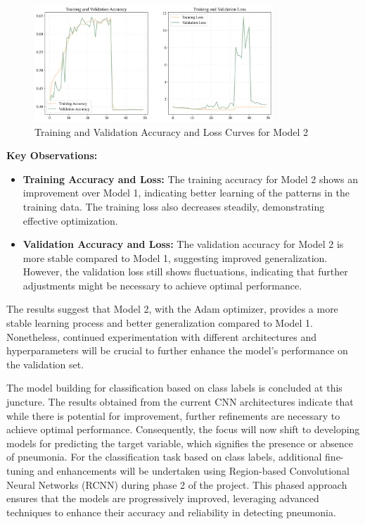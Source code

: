 \begin{figure}[H]
    \centering
    \includegraphics[width=0.8\textwidth]{figures/Figure30.png}
    \caption{Training and Validation Accuracy and Loss Curves for Model 2}
    \label{fig:chap3 figure2}
\end{figure}


\textbf{Key Observations:}
\begin{itemize}
    \item \textbf{Training Accuracy and Loss:} The training accuracy for Model 2 shows an improvement over Model 1, indicating better learning of the patterns in the training data. The training loss also decreases steadily, demonstrating effective optimization.
    \item \textbf{Validation Accuracy and Loss:} The validation accuracy for Model 2 is more stable compared to Model 1, suggesting improved generalization. However, the validation loss still shows fluctuations, indicating that further adjustments might be necessary to achieve optimal performance.
\end{itemize}

The results suggest that Model 2, with the Adam optimizer, provides a more stable learning process and better generalization compared to Model 1. Nonetheless, continued experimentation with different architectures and hyperparameters will be crucial to further enhance the model's performance on the validation set.

The model building for classification based on class labels is concluded at this juncture. The results obtained from the current CNN architectures indicate that while there is potential for improvement, further refinements are necessary to achieve optimal performance. Consequently, the focus will now shift to developing models for predicting the target variable, which signifies the presence or absence of pneumonia. For the classification task based on class labels, additional fine-tuning and enhancements will be undertaken using Region-based Convolutional Neural Networks (RCNN) during phase 2 of the project. This phased approach ensures that the models are progressively improved, leveraging advanced techniques to enhance their accuracy and reliability in detecting pneumonia.


